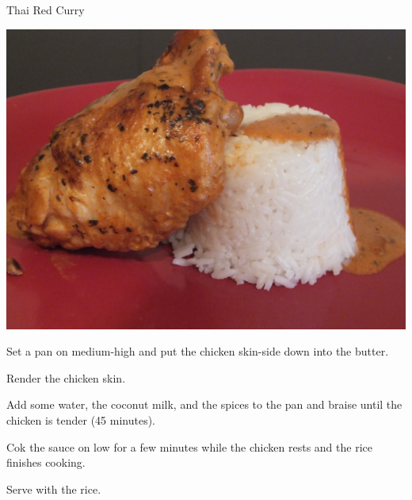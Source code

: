 \documentclass{recipe}
\begin{document}
\begin{recipe}{Thai Red Curry}

  \begin{ingredients}
    \ingredientsep
    \ingredientsep
  \end{ingredients}

  \begin{images}
    \begin{image}
      \includegraphics[width=\linewidth,trim=0px 0px 0px 0px, clip=true]{red_thai_curry-01.jpeg}
    \end{image}
  \end{images}

  \begin{steps}
  \item Set a pan on medium-high and put the chicken skin-side down into the
    butter.
  \item Render the chicken skin.
  \item Add some water, the coconut milk, and the spices to the pan and braise
    until the chicken is tender (45 minutes).
  \item Cok the sauce on low for a few minutes while the chicken rests
    and the rice finishes cooking.
  \item Serve with the rice.
  \end{steps}
\end{recipe}
\end{document}

